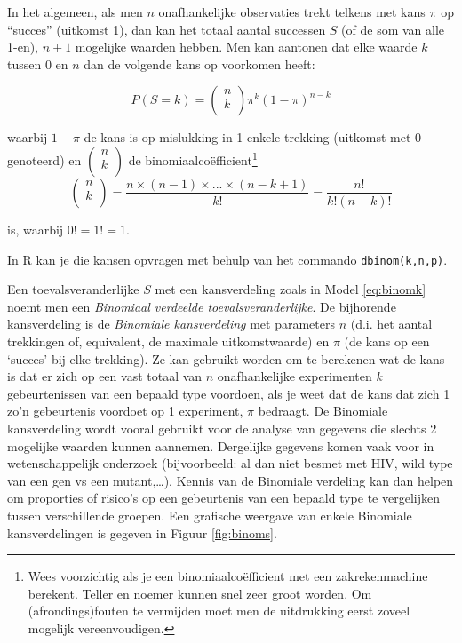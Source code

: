 \documentclass[12pt,dutch,coursenotes]{book}
\let\rmarkdownfootnote\footnote%
\def\footnote{\protect\rmarkdownfootnote}
\theoremstyle{definition}
\theoremstyle{definition}
\theoremstyle{definition}
\theoremstyle{remark}
\begin{document}
In het algemeen, als men \(n\) onafhankelijke observaties trekt telkens
met kans \(\pi\) op ``succes'' (uitkomst 1), dan kan het totaal aantal
successen \(S\) (of de som van alle 1-en), \(n+1\) mogelijke waarden
hebben. Men kan aantonen dat elke waarde \(k\) tussen 0 en \(n\) dan de
volgende kans op voorkomen heeft:

\begin{equation}
P(S=k) = \left ( 
\begin{array}{c}
n \\ 
k \\ 
\end{array}
\right ) \pi^k (1-\pi)^{n-k}  \label{eq:binomk}
\end{equation}

waarbij \(1-\pi\) de kans is op mislukking in 1 enkele trekking
(uitkomst met 0 genoteerd) en
\(\left(\begin{array}{c} n \\ k \\ \end{array}\right)\) de
binomiaalcoëfficient\footnote{Wees voorzichtig als je een
  binomiaalcoëfficient met een zakrekenmachine berekent. Teller en
  noemer kunnen snel zeer groot worden. Om (afrondings)fouten te
  vermijden moet men de uitdrukking eerst zoveel mogelijk
  vereenvoudigen.}\\

\begin{equation*}
\left ( 
\begin{array}{c}
n \\ 
k \\ 
\end{array}
\right ) = \frac{n \times (n-1) \times ...\times (n-k+1) }{ k!} = \frac{ n!}{ k!(n-k)! }
\end{equation*}

is, waarbij \(0!=1!=1\).

In R kan je die kansen opvragen met behulp van het commando
\texttt{dbinom(k,n,p)}.

Een toevalsveranderlijke \(S\) met een kansverdeling zoals in Model
\eqref{eq:binomk} noemt men een \emph{Binomiaal verdeelde
toevalsveranderlijke}. De bijhorende kansverdeling is de \emph{Binomiale
kansverdeling} met parameters \(n\) (d.i. het aantal trekkingen of,
equivalent, de maximale uitkomstwaarde) en \(\pi\) (de kans op een
`succes' bij elke trekking). Ze kan gebruikt worden om te berekenen wat
de kans is dat er zich op een vast totaal van \(n\) onafhankelijke
experimenten \(k\) gebeurtenissen van een bepaald type voordoen, als je
weet dat de kans dat zich 1 zo'n gebeurtenis voordoet op 1 experiment,
\(\pi\) bedraagt. De Binomiale kansverdeling wordt vooral gebruikt voor
de analyse van gegevens die slechts 2 mogelijke waarden kunnen aannemen.
Dergelijke gegevens komen vaak voor in wetenschappelijk onderzoek
(bijvoorbeeld: al dan niet besmet met HIV, wild type van een gen vs een
mutant,\ldots{}). Kennis van de Binomiale verdeling kan dan helpen om
proporties of risico's op een gebeurtenis van een bepaald type te
vergelijken tussen verschillende groepen. Een grafische weergave van
enkele Binomiale kansverdelingen is gegeven in Figuur \ref{fig:binoms}.
\end{document}
